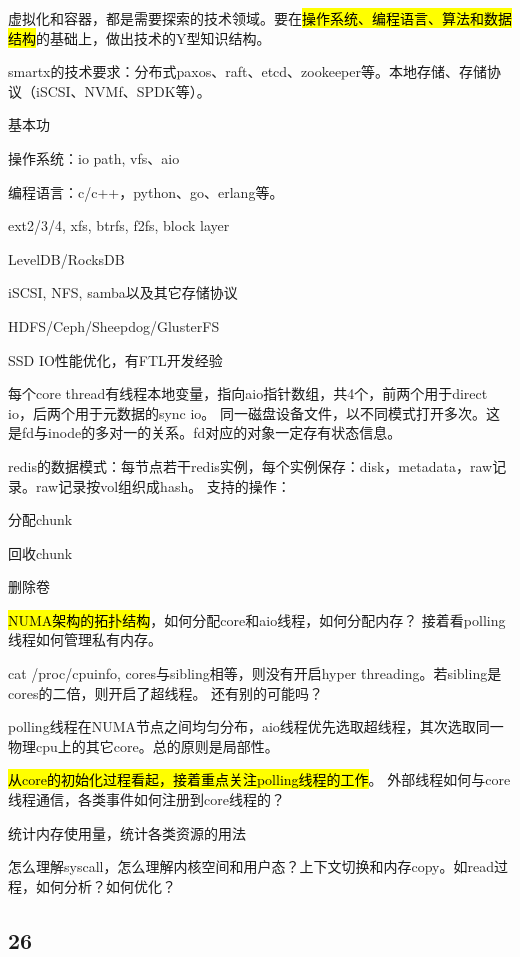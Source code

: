 虚拟化和容器，都是需要探索的技术领域。要在\hl{操作系统、编程语言、算法和数据结构}的基础上，做出技术的Y型知识结构。

smartx的技术要求：分布式paxos、raft、etcd、zookeeper等。本地存储、存储协议（iSCSI、NVMf、SPDK等）。

基本功
\begin{enumbox}
\item 操作系统：io path, vfs、aio
\item 编程语言：c/c++，python、go、erlang等。
\item ext2/3/4, xfs, btrfs, f2fs, block layer
\item LevelDB/RocksDB
\item iSCSI, NFS, samba以及其它存储协议
\item HDFS/Ceph/Sheepdog/GlusterFS
\item SSD IO性能优化，有FTL开发经验
\end{enumbox}

每个core thread有线程本地变量，指向aio指针数组，共4个，前两个用于direct io，后两个用于元数据的sync io。
同一磁盘设备文件，以不同模式打开多次。这是fd与inode的多对一的关系。fd对应的对象一定存有状态信息。

redis的数据模式：每节点若干redis实例，每个实例保存：disk，metadata，raw记录。raw记录按vol组织成hash。
支持的操作：
\begin{enumbox}
\item 分配chunk
\item 回收chunk
\item 删除卷
\end{enumbox}

\hl{NUMA架构的拓扑结构}，如何分配core和aio线程，如何分配内存？
接着看polling线程如何管理私有内存。

cat /proc/cpuinfo, cores与sibling相等，则没有开启hyper threading。若sibling是cores的二倍，则开启了超线程。
还有别的可能吗？

polling线程在NUMA节点之间均匀分布，aio线程优先选取超线程，其次选取同一物理cpu上的其它core。总的原则是局部性。

\hl{从core的初始化过程看起，接着重点关注polling线程的工作}。
外部线程如何与core线程通信，各类事件如何注册到core线程的？

统计内存使用量，统计各类资源的用法

怎么理解syscall，怎么理解内核空间和用户态？上下文切换和内存copy。如read过程，如何分析？如何优化？

\subsection{26}


